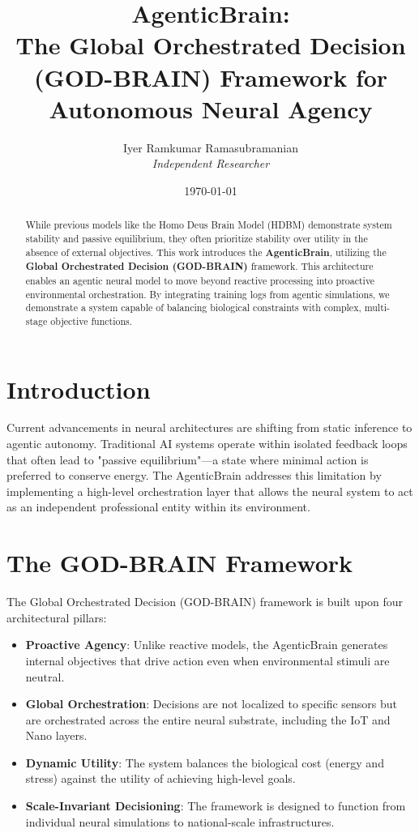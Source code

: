 \documentclass[12pt]{article}
\title{\textbf{AgenticBrain: \\ The Global Orchestrated Decision (GOD-BRAIN) Framework for Autonomous Neural Agency}}
\author{Iyer Ramkumar Ramasubramanian \\ \textit{Independent Researcher}}
\date{\today}
\begin{document}
\maketitle

\begin{abstract}
While previous models like the Homo Deus Brain Model (HDBM) demonstrate system stability and passive equilibrium, they often prioritize stability over utility in the absence of external objectives. This work introduces the \textbf{AgenticBrain}, utilizing the \textbf{Global Orchestrated Decision (GOD-BRAIN)} framework. This architecture enables an agentic neural model to move beyond reactive processing into proactive environmental orchestration. By integrating training logs from agentic simulations, we demonstrate a system capable of balancing biological constraints with complex, multi-stage objective functions.
\end{abstract}

\section{Introduction}
Current advancements in neural architectures are shifting from static inference to agentic autonomy. Traditional AI systems operate within isolated feedback loops that often lead to "passive equilibrium"—a state where minimal action is preferred to conserve energy. The AgenticBrain addresses this limitation by implementing a high-level orchestration layer that allows the neural system to act as an independent professional entity within its environment.

\section{The GOD-BRAIN Framework}

The Global Orchestrated Decision (GOD-BRAIN) framework is built upon four architectural pillars:

\begin{itemize}
\item \textbf{Proactive Agency}: Unlike reactive models, the AgenticBrain generates internal objectives that drive action even when environmental stimuli are neutral.
\item \textbf{Global Orchestration}: Decisions are not localized to specific sensors but are orchestrated across the entire neural substrate, including the IoT and Nano layers.
\item \textbf{Dynamic Utility}: The system balances the biological cost (energy and stress) against the utility of achieving high-level goals.
\item \textbf{Scale-Invariant Decisioning}: The framework is designed to function from individual neural simulations to national-scale infrastructures.
\end{itemize}
\end{document}
